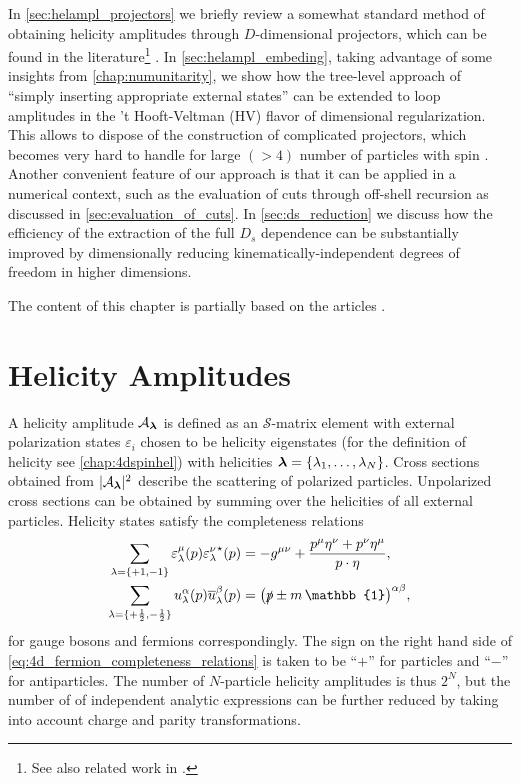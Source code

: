 In \cref{sec:helampl_projectors} we briefly review a somewhat standard 
method of obtaining helicity amplitudes through $D$-dimensional projectors,
which can be found in the literature\footnote{
  See also related work in \cite{Chen:2019wyb,Boels:2018nrr}. 
} \cite{Garland:2002ak, Moch:2002hm, Glover:2003cm, Glover:2004si,Gehrmann:2009vu,Gehrmann:2011aa}.
In \cref{sec:helampl_embeding}, 
taking advantage of some insights from \cref{chap:numunitarity},
we show how the tree-level approach of ``simply inserting appropriate external states'' can
be extended to loop amplitudes in the 't Hooft-Veltman (HV) flavor of dimensional regularization.
This allows to dispose of the construction of complicated projectors, which
becomes very hard to handle for large $(> 4)$ number of particles with spin \cite{Peraro:2019cjj}. 
Another convenient feature of our approach is that it can be applied in a numerical context, such
as the evaluation of cuts through off-shell recursion as discussed in \cref{sec:evaluation_of_cuts}.
In \cref{sec:ds_reduction} we discuss how
the efficiency of the extraction of the full $D_s$ dependence can be substantially improved
by dimensionally reducing kinematically-independent degrees of freedom in higher dimensions.

The content of this chapter is partially based on the articles \cite{Anger:2018ove,Abreu:2018jgq,Abreu:2019odu}.

\section{Helicity Amplitudes}
\label{sec:HV_helicity_amplitudes}

A helicity amplitude $\mathcal{A}_{\vb*{\lambda}}$
is defined as an $\mathcal{S}$-matrix element
with external polarization states $\varepsilon_{i}$ chosen to be
helicity eigenstates (for the definition of helicity see \cref{chap:4dspinhel}) with helicities $\vb*{\lambda}=\{\lambda_1,\ldots{},\lambda_N\}$.
Cross sections obtained from $\vert \mathcal{A}_{\vb*{\lambda}}{} \vert^2$ describe
the scattering of polarized particles.
Unpolarized cross sections can be obtained by summing over the helicities of all external particles.
Helicity states satisfy the completeness relations
\begin{subequations}
  \label{eq:4d_completeness_relations}
  \begin{align}
    \sum_{\lambda=\{+1,-1\}} \varepsilon^\mu_\lambda(p){\varepsilon^\nu_\lambda}^{\star{}}(p)  &= -g^{\mu\nu} + \frac{p^\mu \eta^\nu + p^\nu \eta^\mu}{\sp(p,\eta)}, \\ \label{eq:4d_fermion_completeness_relations}
    \sum_{\lambda=\{+\frac{1}{2},-\frac{1}{2}\}} u^\alpha_\lambda(p){\overline{u}_\lambda^\beta}(p)  &= \qty(\slashed{p}  \pm m\,\mathbb{1})^{\alpha\beta},
  \end{align}
\end{subequations}
for gauge bosons and fermions correspondingly. The sign on the right hand side of \cref{eq:4d_fermion_completeness_relations} is taken to be ``$+$'' for
particles and ``$-$'' for antiparticles.
The number of $N$-particle helicity amplitudes is thus $2^N$, but
the number of of independent analytic expressions can be further reduced by taking into account charge and parity transformations.

